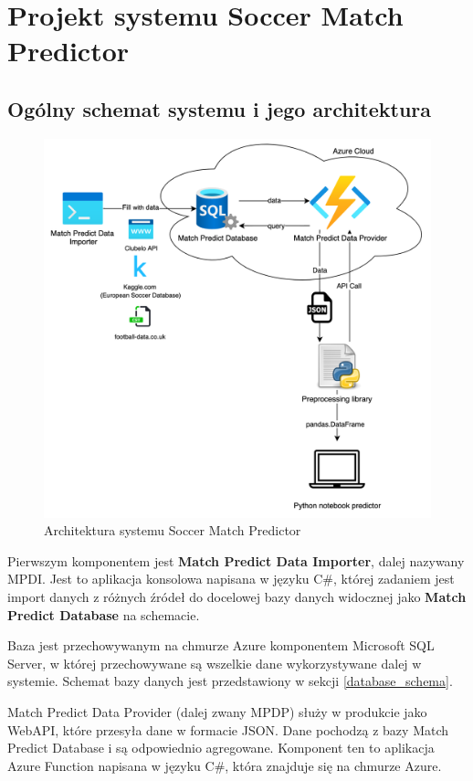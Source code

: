 \chapter{Projekt systemu Soccer Match Predictor}
\section{Ogólny schemat systemu i jego architektura}
    \begin{figure}[h] 
        \centering\includegraphics[width=\textwidth]{figures/MatchPredictorArchitecture.png}
        \caption{Architektura systemu Soccer Match Predictor}\label{fig:arch1}
    \end{figure}
    \newpage

\noindent Pierwszym komponentem jest \textbf{Match Predict Data Importer}, dalej nazywany MPDI. Jest to aplikacja konsolowa napisana w języku C\#, której zadaniem jest import danych z różnych źródeł do docelowej bazy danych widocznej jako \textbf{Match Predict Database} na schemacie.

Baza jest przechowywanym na chmurze Azure komponentem Microsoft SQL Server, w której przechowywane są wszelkie dane wykorzystywane dalej w systemie. Schemat bazy danych jest przedstawiony w sekcji \ref{database_schema}.

Match Predict Data Provider (dalej zwany MPDP) służy w produkcie jako WebAPI, które przesyła dane w formacie JSON. Dane pochodzą z bazy Match Predict Database i są odpowiednio agregowane. Komponent ten to aplikacja Azure Function napisana w języku C\#, która znajduje się na chmurze Azure.\\

